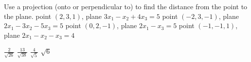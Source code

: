 
\begin{Exercise}[
name={},
title={}, 
difficulty=0,
origin={\cite{SM}}]
Use a projection (onto or perpendicular to) to find the distance from the point to the plane.
\Question point $(2,3,1)$, plane $3x_1-x_2+4x_3=5$
\Question point $(-2,3,-1)$, plane $2x_1-3x_2-5x_3=5$
\Question point $(0,2,-1)$, plane $2x_1-x_3=5$
\Question point $(-1,-1,1)$, plane $2x_1-x_2-x_3=4$
\end{Exercise}

\begin{Answer}
\Question $\frac{2}{\sqrt{26}}$
\Question $\frac{13}{\sqrt{38}}$
\Question $\frac{4}{\sqrt{5}}$
\Question $\sqrt{6}$
\end{Answer}
